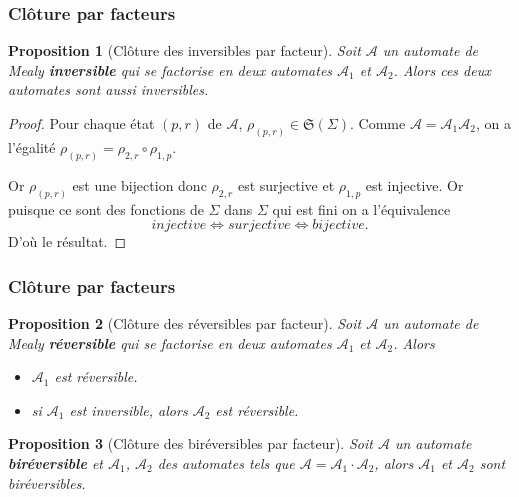 \documentclass[11pt]{beamer}
\newtheorem{prop}{Proposition}
\begin{document}
\begin{frame}
  \frametitle{Clôture par facteurs}
  \begin{prop}[Clôture des inversibles par facteur]
    Soit $\mathcal{A}$ un automate de Mealy \textbf{inversible} qui se factorise en deux automates $\mathcal{A}_1$ et $\mathcal{A}_2$. Alors ces deux automates sont aussi inversibles.
  \end{prop}

  \begin{proof}
    Pour chaque état $(p, r)$ de $\mathcal{A}$, $\rho_{(p, r)}\in \mathfrak{S}(\Sigma)$. Comme $\mathcal{A}=\mathcal{A}_1\mathcal{A}_2$, on a l'égalité $\rho_{(p, r)}=\rho_{2,r}\circ\rho_{1,p}$.

    Or $\rho_{(p, r)}$ est une bijection donc $\rho_{2,r}$ est surjective et ${\rho_{1,p}}$ est injective. Or puisque ce sont des fonctions de $\Sigma$ dans $\Sigma$ qui est fini on a l'équivalence
    \[ injective \iff surjective \iff bijective. \]
    D'où le résultat.
  \end{proof}

\end{frame}

\begin{frame}
  \frametitle{Clôture par facteurs}
  \begin{prop}[Clôture des réversibles par facteur]
    Soit $\mathcal{A}$ un automate de Mealy \textbf{réversible} qui se factorise en deux automates $\mathcal{A}_1$ et $\mathcal{A}_2$. Alors
    \begin{itemize}
    \item $\mathcal{A}_1$ est réversible.
    \item si $\mathcal{A}_1$ est inversible, alors $\mathcal{A}_2$ est réversible.
    \end{itemize}
  \end{prop}

  \begin{prop}[Clôture des biréversibles par facteur]
    Soit $\mathcal{A}$ un automate \textbf{biréversible} et $\mathcal{A}_1$, $\mathcal{A}_2$ des automates tels que $\mathcal{A}=\mathcal{A}_1\cdot\mathcal{A}_2$, alors $\mathcal{A}_1$ et $\mathcal{A}_2$ sont biréversibles.
  \end{prop}

\end{frame}
\end{document}
